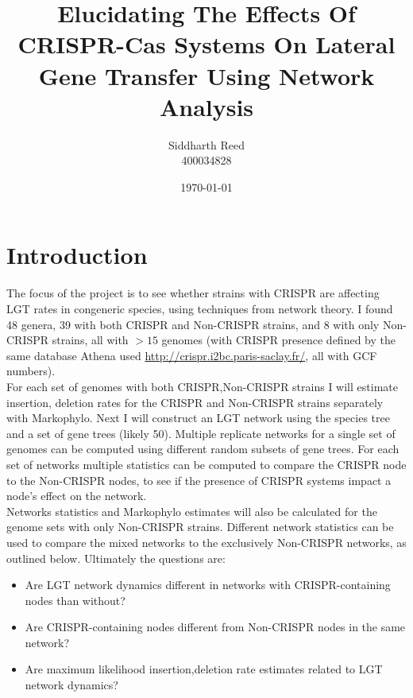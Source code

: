 \documentclass[12pt,letter]{article}
\begin{document}
\linespread{1.25} %
\title{Elucidating The Effects Of CRISPR-Cas Systems On Lateral Gene Transfer Using Network Analysis}
\author{Siddharth Reed\\ 400034828}
\date{\today}
\maketitle
\newpage
\section*{Introduction}
The focus of the project is to see whether strains with CRISPR are affecting LGT rates in congeneric species, using techniques from network theory. I found 48  genera, 39 with both CRISPR and Non-CRISPR strains, and 8 with only Non-CRISPR strains, all with $>15$ genomes (with CRISPR presence defined by the same database Athena used \url{http://crispr.i2bc.paris-saclay.fr/}, all with GCF numbers).\\
For each set of genomes with both CRISPR,Non-CRISPR strains I will estimate insertion, deletion rates for the CRISPR and Non-CRISPR strains separately with Markophylo. Next I will construct an LGT network using the species tree and a set of gene trees (likely 50). Multiple replicate networks for a single set of genomes can be computed using different random subsets of gene trees. For each set of networks multiple statistics can be computed to compare the CRISPR node to the Non-CRISPR nodes, to see if the presence of CRISPR systems impact a node's effect on the network.\\
Networks statistics and Markophylo estimates will also be calculated for the genome sets with only Non-CRISPR strains. Different network statistics can be used to compare the mixed networks to the exclusively Non-CRISPR networks, as outlined below.
Ultimately the questions are:
\begin{itemize}
    \item Are LGT network dynamics different in networks with CRISPR-containing nodes than without?
    \item Are CRISPR-containing nodes different from Non-CRISPR nodes in the same network?
    \item Are maximum likelihood insertion,deletion rate estimates related to LGT network dynamics?
\end{itemize}
\end{document}
